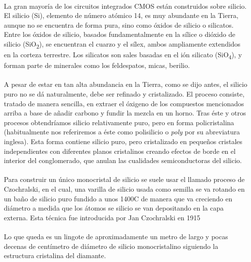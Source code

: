 \paragraph{}
La gran mayoría de los circuitos integrados CMOS están construidos sobre silicio.
El silicio (Si), elemento de número atómico 14, es muy abundante en la Tierra, aunque
no se encuentra de forma pura, sino como óxidos de silicio o silicatos. Entre los
óxidos de silicio, basados fundamentalmente en la sílice o dióxido de silicio
(SiO\textsubscript{2}), se encuentran el cuarzo y el sílex, ambos ampliamente extendidos
en la corteza terrestre. Los silicatos son sales basadas en el ión silicato (SiO\textsubscript{4}),
y forman parte de minerales como los feldespatos, micas, berilio.

\paragraph{}
A pesar de estar en tan alta abundancia en la Tierra, como se dijo antes, el silicio
puro no se dá naturalmente, debe ser refinado y cristalizado. El proceso consiste,
tratado de manera sencilla, en extraer el óxigeno de los compuestos mencionados arriba
a base de añadir carbono y fundir la mezcla en un horno. Tras éste y otros procesos
obtendríamos silicio relativamente puro, pero en forma policristalina (habitualmente
nos referiremos a éste como polisilicio o \textit{poly} por su abreviatura inglesa).
Esta forma contiene silicio puro, pero
cristalizado en pequeños cristales independientes con diferentes planos cristalinos
creando efectos de borde en el interior del conglomerado, que anulan las cualidades
semiconductoras del silicio.

\paragraph{}
Para construir un único monocristal de silicio se suele usar el llamado proceso
de Czochralski, en el cual, una varilla de silicio usada como semilla se va
rotando en un baño de silicio puro fundido a unos 1400\centigrade C de manera que va creciendo
en diámetro a medida que los átomos se silicio se van depositando en la capa externa.
Esta técnica fue introducida por Jan Czochralski en 1915

\paragraph{}
Lo que queda es un lingote de aproximadamente un metro de largo y pocas decenas
de centímetro de diámetro de silicio monocristalino siguiendo la estructura cristalina del
diamante.

